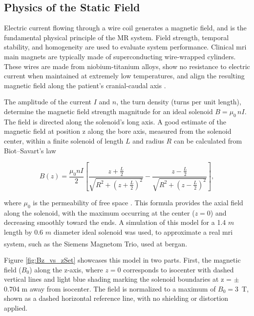 \subsection{Physics of the Static Field}
\label{sec:PhyField}

Electric current flowing through a wire coil generates a magnetic field, and is the fundamental physical principle of the MR system. Field strength, temporal stability, and homogeneity are used to evaluate system performance. Clinical \gls{mri} main magnets are typically made of superconducting wire-wrapped cylinders. These wires are made from niobium-titanium alloys, show no resistance to electric current when maintained at extremely low temperatures, and align the resulting magnetic field along the patient's cranial-caudal axis \cite{Prince_MedicalImaging_2015}. 

The amplitude of the current $I$ and $n$, the turn density (turns per unit length), determine the magnetic field strength magnitude for an ideal solenoid $B = \mu_{0} \, n I$. The field is directed along the solenoid's long axis. A good estimate of the magnetic field at position z along the bore axis, measured from the solenoid center, within a finite solenoid of length $L$ and radius $R$ can be calculated from Biot–Savart's law 

\begin{equation}
	B(z) = \frac{\mu_0 n I}{2} 
	\left[
	\frac{z + \frac{L}{2}}{\sqrt{R^2 + \left(z + \frac{L}{2}\right)^2}} 
	-
	\frac{z - \frac{L}{2}}{\sqrt{R^2 + \left(z - \frac{L}{2}\right)^2}}
	\right],
\end{equation}

\noindent where $\mu_0$ is the permeability of free space \cite{griffiths2013electrodynamics}. This formula provides the axial field along the solenoid, with the maximum occurring at the center ($z=0$) and decreasing smoothly toward the ends. A simulation of this model for a 1.4 $m$ length by 0.6 $m$ diameter ideal solenoid was used, to approximate a real \gls{mri} system, such as the Siemens Magnetom Trio\textsuperscript{\texttrademark}, used at \gls{bergan}.

Figure \ref{fig:Bz_vs_zSet} showcases this model in two parts. First, the magnetic field ($B_0$) along the z-axis, where $z=0$ corresponds to isocenter with dashed vertical lines and light blue shading marking the solenoid boundaries at z = $\pm$ 0.704 m away from isocenter. The field is normalized to a maximum of $B_0 = 3$~T, shown as a dashed horizontal reference line, with no shielding or distortion applied. 

